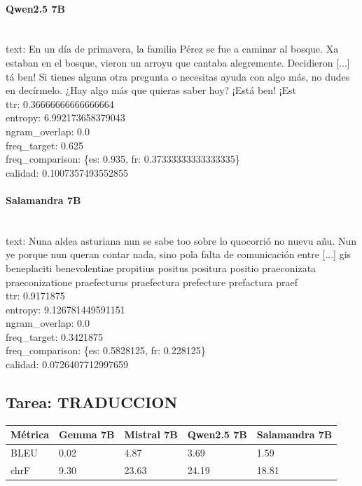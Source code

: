\paragraph{Qwen2.5 7B}~\\
{text:} En un día de primavera, la familia Pérez se fue a caminar al bosque. Xa estaban en el bosque, vieron un arroyu que cantaba alegremente. Decidieron [...] tá ben! Si tienes alguna otra pregunta o necesitas ayuda con algo más, no dudes en decírmelo. ¿Hay algo más que quieras saber hoy? ¡Está ben! ¡Est\\
{ttr:} 0.36666666666666664\\
{entropy:} 6.992173658379043\\
{ngram\_overlap:} 0.0\\
{freq\_target:} 0.625\\
{freq\_comparison:} \{\textquotesingle{}es\textquotesingle{}: 0.935, \textquotesingle{}fr\textquotesingle{}: 0.37333333333333335\}\\
{calidad:} 0.1007357493552855\\

\paragraph{Salamandra 7B}~\\
{text:} Nuna aldea asturiana nun se sabe too sobre lo qu\textquotesingle{}ocorrió no nuevu añu. Nun ye porque nun queran contar nada, sino pola falta de comunicación entre [...] gis beneplaciti benevolentiae propitius positus positura positio praeconizata praeconizatione praefecturus praefectura prefecture prefactura praef\\
{ttr:} 0.9171875\\
{entropy:} 9.126781449591151\\
{ngram\_overlap:} 0.0\\
{freq\_target:} 0.3421875\\
{freq\_comparison:} \{\textquotesingle{}es\textquotesingle{}: 0.5828125, \textquotesingle{}fr\textquotesingle{}: 0.228125\}\\
{calidad:} 0.0726407712997659\\

\subsection{Tarea: TRADUCCION}\label{tarea-traduccion}
{\def\LTcaptype{none}
\begin{longtable}[]{@{}lllll@{}}
\toprule\noalign{}
Métrica & Gemma 7B & Mistral 7B & Qwen2.5 7B & Salamandra 7B \\
\midrule\noalign{}
\endhead
\bottomrule\noalign{}
\endlastfoot
BLEU & 0.02 & 4.87 & 3.69 & 1.59 \\
chrF & 9.30 & 23.63 & 24.19 & 18.81 \\
\end{longtable}}

